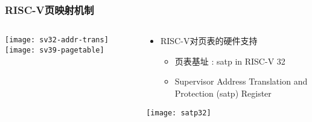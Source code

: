 \begin{frame}   
	\frametitle{RISC-V页映射机制}
	
	\begin{columns}[t]
		
		\begin{column}{.4\textwidth}
			
		\centering
		\texttt{[image: sv32-addr-trans]}
		\texttt{[image: sv39-pagetable]}
			
		\end{column}
		
		
		\begin{column}{.5\textwidth}
			
			\begin{itemize}\large
				\item RISC-V对页表的硬件支持
				\begin{itemize}
					\item 页表基址 \pause : satp in RISC-V 32
					\item  Supervisor Address Translation and Protection (satp) Register
					
							
				\end{itemize}
			\end{itemize}
			
			\texttt{[image: satp32]}
			
		\end{column}
		
		
	\end{columns}
	
\end{frame}



